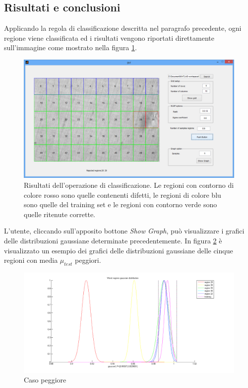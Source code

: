 \subsection{Risultati e conclusioni}
Applicando la regola di classificazione descritta nel paragrafo precedente, ogni regione viene classificata ed i risultati vengono riportati direttamente sull'immagine come mostrato nella figura \ref{fig:GUIpostLBP}.

\begin{figure}[ht]
\begin{center}
\includegraphics[width=.95\textwidth]{img/gui_post_lbp}
\caption{Risultati dell'operazione di classificazione. Le regioni con contorno di colore rosso sono quelle contenenti difetti, le regioni di colore blu sono quelle del training set e le regioni con contorno verde sono quelle ritenute corrette. }
\label{fig:GUIpostLBP}
\end{center}
\end{figure}

L'utente, cliccando sull'apposito bottone \textit{Show Graph}, può visualizzare i grafici delle distribuzioni gaussiane determinate precedentemente. In figura \ref{fig:worstGraph} è visualizzato un esempio dei grafici delle distribuzioni gaussiane delle cinque regioni con media $\mu_{test}$ peggiori.


\begin{figure}[ht]
\begin{center}
\includegraphics[width=1\textwidth]{img/worst_graph}
\caption{ Caso peggiore }
\label{fig:worstGraph}
\end{center}
\end{figure}


